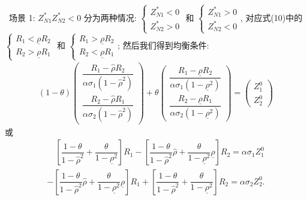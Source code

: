 \documentclass[10.0pt]{article}
\begin{document}
\quad \ 
场景 1: $ Z_{N 1}^* Z_{N 2}^* < 0 $ 分为两种情况: $ \left\{ \begin{matrix} Z_{N 1}^* < 0 \\ Z_{N 2}^* > 0 \end{matrix} \right. $ 和 $ \left\{ \begin{matrix} Z_{N 1}^* > 0 \\ Z_{N 2}^* < 0 \end{matrix} \right. $, 对应式(10)中的 $ \left\{ \begin{matrix} R_1 < \underline{\rho} R_2 \\ R_2 > \underline{\rho} R_1 \end{matrix} \right. $ 和 $ \left\{ \begin{matrix} R_1 > \underline{\rho} R_2 \\ R_2 < \underline{\rho} R_1 \end{matrix} \right. $; 然后我们得到均衡条件:
\begin{eqnarray}
(1 - \theta) \left( \begin{matrix} \dfrac{R_1 - \hat \rho R_2}{\alpha \sigma_1 (1 - {\hat \rho}^2)} \\ \dfrac{R_2 - \hat \rho R_1}{\alpha \sigma_2 (1 - {\hat \rho}^2)} \end{matrix} \right) + \theta \left( \begin{matrix} \dfrac{R_1 - \underline{\rho} R_2}{\alpha \sigma_1 (1 - \underline{\rho}^2)} \\ \dfrac{R_2 - \underline{\rho} R_1}{\alpha \sigma_2 (1 - \underline{\rho}^2)} \end{matrix} \right) = \left( \begin{matrix} Z_1^0 \\ Z_2^0 \end{matrix} \right)
\end{eqnarray}
或
\begin{eqnarray*}
& \quad \left[ \dfrac{1 - \theta}{1 - {\hat \rho}^2} + \dfrac{\theta}{1 - \underline{\rho}^2} \right] R_1 - \left[ \dfrac{1 - \theta}{1 - {\hat \rho}^2} {\hat \rho} + \dfrac{\theta}{1 - \underline{\rho}^2} \underline{\rho} \right] R_2 = \alpha \sigma_1 Z_1^0 & \\
& - \left[ \dfrac{1 - \theta}{1 - {\hat \rho}^2} {\hat \rho} + \dfrac{\theta}{1 - \underline{\rho}^2} \underline{\rho} \right] R_1 + \left[ \dfrac{1 - \theta}{1 - {\hat \rho}^2} + \dfrac{\theta}{1 - \underline{\rho}^2} \right] R_2 = \alpha \sigma_2 Z_2^0. & 
\end{eqnarray*}
\end{document}
